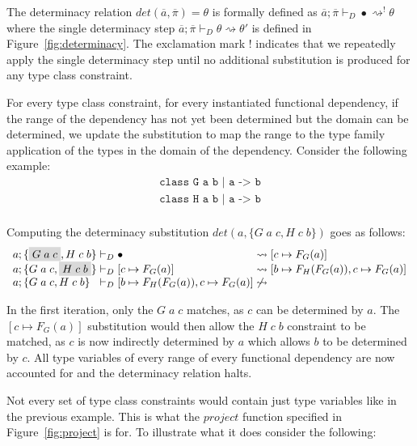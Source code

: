 The determinacy relation $det(\overline{a},\overline{\pi}) = \theta$ is formally
defined as $\overline{a};\overline{\pi} \vdash_{D} \bullet \rightsquigarrow^!
\theta$ where the single determinacy step $\overline{a};\overline{\pi}
\vdash_{D} \theta \rightsquigarrow \theta'$ is defined in
Figure~\ref{fig:determinacy}. The exclamation mark $!$ indicates that we
repeatedly apply the single determinacy step until no additional substitution is
produced for any type class constraint.

For every type class constraint, for every instantiated functional dependency,
if the range of the dependency has not yet been determined but the domain can be
determined, we update the substitution to map the range to the type family
application of the types in the domain of the dependency. Consider the following
example:
\[
\begin{array}{l}
\texttt{class G a b | a -> b}\\
\texttt{class H a b | a -> b}\\
\end{array}
\]

Computing the determinacy substitution $det(a, \{G \; a \; c, H \; c \; b \} )$
goes as follows:
\[
\begin{array}{l@{\hspace{1mm}}l@{\hspace{1mm}}c@{\hspace{1mm}}l}
a; \{\highlight{G \; a \; c}, H \; c \; b\} &\vdash_{D} \bullet
&\rightsquigarrow& [c \mapsto F_G(a)]
\\
a; \{G \; a \; c, \highlight{H \; c \; b}\} &\vdash_{D}  [c \mapsto F_G(a)]
&\rightsquigarrow& [b \mapsto F_H(F_G(a)), c \mapsto F_G(a)]
\\
a; \{G \; a \; c, H \; c \; b\} &\vdash_{D}  [b \mapsto F_H(F_G(a)), c \mapsto
F_G(a)] &\not\rightsquigarrow&
\end{array}
\]

In the first iteration, only the $G \; a \; c$ matches, as $c$ can be determined
by $a$. The $[c \mapsto F_G(a)]$ substitution would then allow the $H \; c \; b$
constraint to be matched, as $c$ is now indirectly determined by $a$ which
allows $b$ to be determined by $c$. All type variables of every range of every
functional dependency are now accounted for and the determinacy relation halts.

Not every set of type class constraints would contain just type variables like
in the previous example. This is what the $project$ function specified in
Figure~\ref{fig:project} is for. To illustrate what it does consider the
following:

